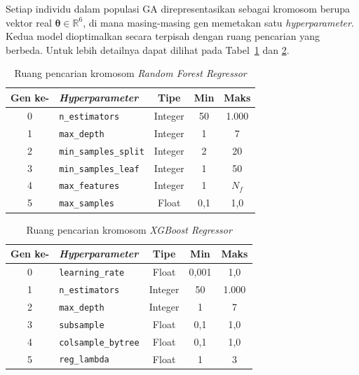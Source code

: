 Setiap individu dalam populasi GA direpresentasikan sebagai kromosom berupa vektor real $\boldsymbol{\theta} \in \mathbb{R}^6$, di mana masing-masing gen memetakan satu \textit{hyperparameter}. Kedua model dioptimalkan secara terpisah dengan ruang pencarian yang berbeda. Untuk lebih detailnya dapat dilihat pada Tabel~\ref{tab:gene_rf} dan \ref{tab:gene_xgb}.

\begin{table}[h!]
\centering
\caption{Ruang pencarian kromosom \textit{Random Forest Regressor}}
\label{tab:gene_rf}
\begin{tabular}{clccc}
\toprule
\textbf{Gen ke-} & \textbf{\textit{Hyperparameter}} & \textbf{Tipe} & \textbf{Min} & \textbf{Maks} \\
\midrule
0 & \texttt{n\_estimators}       & Integer & 50    & 1.000 \\
1 & \texttt{max\_depth}          & Integer & 1     & 7     \\
2 & \texttt{min\_samples\_split} & Integer & 2     & 20    \\
3 & \texttt{min\_samples\_leaf}  & Integer & 1     & 50    \\
4 & \texttt{max\_features}       & Integer & 1     & $N_f$ \\
5 & \texttt{max\_samples}        & Float   & 0{,}1 & 1{,}0 \\
\bottomrule
\end{tabular}
\end{table}

\begin{table}[h!]
\centering
\caption{Ruang pencarian kromosom \textit{XGBoost Regressor}}
\label{tab:gene_xgb}
\begin{tabular}{clccc}
\toprule
\textbf{Gen ke-} & \textbf{\textit{Hyperparameter}} & \textbf{Tipe} & \textbf{Min} & \textbf{Maks} \\
\midrule
0 & \texttt{learning\_rate}    & Float   & 0{,}001 & 1{,}0 \\
1 & \texttt{n\_estimators}     & Integer & 50      & 1.000 \\
2 & \texttt{max\_depth}        & Integer & 1       & 7     \\
3 & \texttt{subsample}         & Float   & 0{,}1   & 1{,}0 \\
4 & \texttt{colsample\_bytree} & Float   & 0{,}1   & 1{,}0 \\
5 & \texttt{reg\_lambda}       & Float   & 1       & 3     \\
\bottomrule
\end{tabular}
\end{table}

